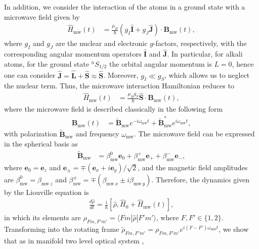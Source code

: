 \documentclass[%
reprint,
 amsmath,amssymb,
 aps,
floatfix,
]{revtex4-1}
\begin{document}
In addition, we consider the interaction of the atoms in a ground state with a microwave field given by \cite{sinuco19}
\begin{align}
\hat{H}_{\mathrm{mw}}(t)&=\frac{\mu_B}{\hbar}\left(g_I \hat{\mathbf{I}}+g_J\hat{\mathbf{J}}\right)\cdot \mathbf{B}_{\mathrm{mw}}(t),
\end{align}
where $g_I$ and $g_J$ are the nuclear and electronic $g$-factors, respectively, with the corresponding angular momentum operators $\hat{\mathbf{I}}$ and $\hat{\mathbf{J}}$. In particular, for alkali atoms, for the ground state $^n S_{1/2}$ the orbital angular momentum is $L=0$, hence one can consider $\hat{\mathbf{J}}=\hat{\mathbf{L}}+\hat{\mathbf{S}}\approx \hat{\mathbf{S}}$. Moreover, $g_I\ll g_S$, which allows us to neglect the nuclear term. Thus, the microwave interaction Hamiltonian reduces to
\begin{align}
\hat{H}_{\mathrm{mw}}(t)&=\frac{\mu_Bg_S}{\hbar}\hat{\mathbf{S}}\cdot \mathbf{B}_{\mathrm{mw}}(t),
\end{align}
where the microwave field is described classically in the following form 
\begin{align}
\mathbf{B}_{\mathrm{mw}}(t)&=\tilde{\mathbf{B}}_{\mathrm{mw}}e^{-i\omega_{\mathrm{mw}}t}+\tilde{\mathbf{B}}_{\mathrm{mw}}^*e^{i\omega_{\mathrm{mw}}t},
\end{align}
with polarization $\tilde{\mathbf{B}}_{\mathrm{mw}}$ and frequency $\omega_{\mathrm{mw}}$.
The microwave field can be expressed in the spherical basis as
\begin{align}
\tilde{\mathbf{B}}_{\mathrm{mw}}&=\beta_{\mathrm{mw}}^0 \mathbf{e}_0 + \beta_{\mathrm{mw}}^+\mathbf{e}_+  +\beta_{\mathrm{mw}}^-\mathbf{e}_-,
\end{align}
where $\mathbf{e}_0=\mathbf{e}_z$ and $\mathbf{e}_\pm=\mp(\mathbf{e}_x+i\mathbf{e}_y)/\sqrt{2}$, and the magnetic field amplitudes are $\beta_{\mathrm{mw}}^0=\beta_{\mathrm{mw}~z}$ and 
 $\beta_{\mathrm{mw}}^\pm=\mp(\beta_{\mathrm{mw}~x}\pm i\beta_{\mathrm{mw}~y})$.
Therefore, the dynamics given by the Liouville equation is 
\begin{align}
\frac{d\hat{\rho} }{dt}=\frac{i}{\hbar}[\hat{\rho},\hat{H}_0+
\hat{H}_{\mathrm{mw}}(t)],\label{eq:Liouville}
\end{align}
in which its elements are $\rho_{Fm,F'm'}=\langle Fm|\hat{\rho}|F'm'\rangle$, where $F,F'\in\{1,2\}$.
Transforming into the rotating frame $\tilde{\rho}_{Fm,F'm'}=\rho_{Fm,F'm'}e^{i(F-F')\omega_{\mathrm{mw}}t}$, 
we show that as in manifold two level optical system \cite{Steck15},
\end{document}
